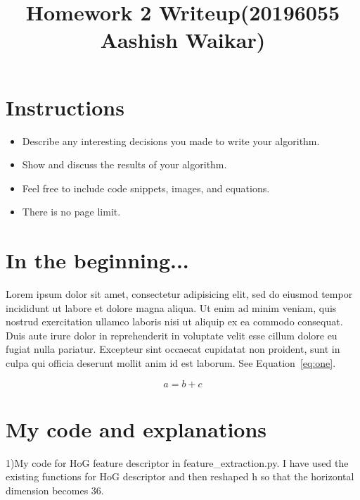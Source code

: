 \title{\vspace{-1cm}Homework 2 Writeup(20196055 Aashish Waikar)}



\maketitle
\vspace{-3cm}
\thispagestyle{fancy}

\section*{Instructions}
\begin{itemize}
  \item Describe any interesting decisions you made to write your algorithm.
  \item Show and discuss the results of your algorithm.
  \item Feel free to include code snippets, images, and equations.
  \item There is no page limit.

\end{itemize}

\section*{In the beginning...}

Lorem ipsum dolor sit amet, consectetur adipisicing elit, sed do eiusmod tempor incididunt ut labore et dolore magna aliqua. Ut enim ad minim veniam, quis nostrud exercitation ullamco laboris nisi ut aliquip ex ea commodo consequat. Duis aute irure dolor in reprehenderit in voluptate velit esse cillum dolore eu fugiat nulla pariatur. Excepteur sint occaecat cupidatat non proident, sunt in culpa qui officia deserunt mollit anim id est laborum. See Equation~\ref{eq:one}.

\begin{equation}
a = b + c
\label{eq:one}
\end{equation}

\section*{My code and explanations}

1)My code for HoG feature descriptor in feature\_extraction.py. I have used the existing functions for HoG descriptor and then reshaped h so that the horizontal dimension becomes 36.

